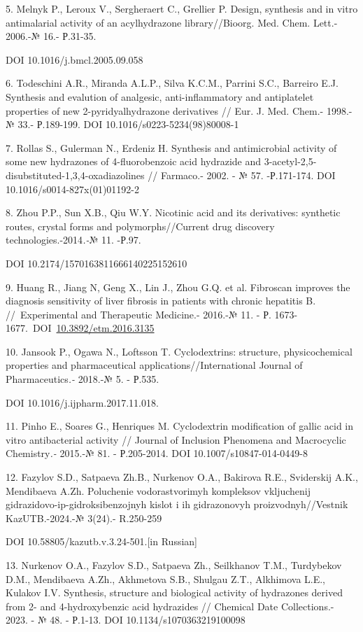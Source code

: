 5. Melnyk P., Leroux V., Sergheraert C., Grellier P. Design, synthesis
and in vitro antimalarial activity of an acylhydrazone library//Bioorg.
Med. Chem. Lett.- 2006.-№ 16.- Р.31-35.

DOI 10.1016/j.bmcl.2005.09.058

6. Todeschini A.R., Miranda A.L.P., Silva K.C.M., Parrini S.C., Barreiro
E.J. Synthesis and evalution of analgesic, anti-inflammatory and
antiplatelet properties of new 2-pyridyalhydrazone derivatives // Eur.
J. Med. Chem.- 1998.- № 33.- Р.189-199. DOI
10.1016/s0223-5234(98)80008-1

7. Rollas S., Gulerman N., Erdeniz H. Synthesis and antimicrobial
activity of some new hydrazones of 4-fluorobenzoic acid hydrazide and
3-acetyl-2,5-disubstituted-1,3,4-oxadiazolines // Farmaco.- 2002. - №
57. -Р.171-174. DOI 10.1016/s0014-827x(01)01192-2

8. Zhou P.P., Sun X.B., Qiu W.Y. Nicotinic acid and its derivatives:
synthetic routes, crystal forms and polymorphs//Current drug discovery
technologies.-2014\emph{.-}№ 11. -Р.97.

DOI 10.2174/1570163811666140225152610

9. Huang R., Jiang N, Geng X., Lin J., Zhou G.Q. et al. Fibroscan
improves the diagnosis sensitivity of liver fibrosis in patients with
chronic hepatitis B. //~Experimental and Therapeutic Medicine.- 2016.-№
11. - Р.
1673-1677.~DOI~\href{http://doi.org/10.3892/etm.2016.3135}{10.3892/etm.2016.3135}~

10. Jansook P., Ogawa N., Loftsson T. Cyclodextrins: structure,
physicochemical properties and pharmaceutical
applications//International Journal of Pharmaceutics\emph{.-} 2018.-№
5. - Р.535.

DOI 10.1016/j.ijpharm.2017.11.018.

11. Pinho E., Soares G., Henriques M. Cyclodextrin modification of gallic
acid in vitro antibacterial activity // Journal of Inclusion Phenomena
and Macrocyclic Chemistry\emph{.-} 2015.-№ 81. - Р.205-2014. DOI
10.1007/s10847-014-0449-8

12. Fazylov S.D., Satpaeva Zh.B., Nurkenov O.A., Bakirova R.E.,
Sviderskij A.K., Mendibaeva A.Zh. Poluchenie vodorastvorimyh kompleksov
vkljuchenij gidrazidovo-ip-gidroksibenzojnyh kislot i ih gidrazonovyh
proizvodnyh//Vestnik KazUTB.-2024.-№ 3(24).- R.250-259

DOI 10.58805/kazutb.v.3.24-501.{[}in Russian{]}

13. Nurkenov O.A., Fazylov S.D., Satpaeva Zh., Seilkhanov T.M.,
Turdybekov D.M., Mendibaeva A.Zh., Akhmetova S.B., Shulgau Z.T.,
Alkhimova L.E., Kulakov I.V. Synthesis, structure and biological
activity of hydrazones derived from 2- and 4-hydroxybenzic acid
hydrazides // Chemical Date Collections.- 2023. - № 48. - Р.1-13. DOI
10.1134/s1070363219100098~

